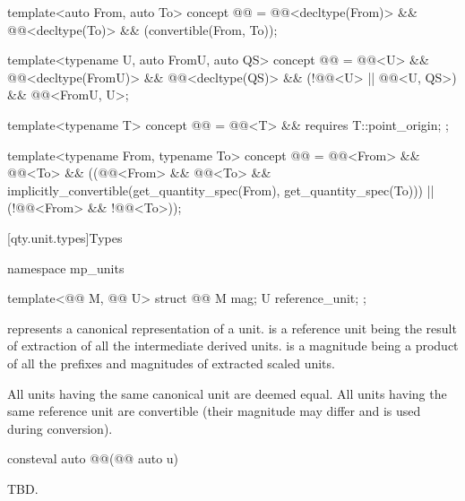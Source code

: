 \begin{itemdecl}
template<auto From, auto To>
concept @@ =
  @@<decltype(From)> && @@<decltype(To)> && (convertible(From, To));

template<typename U, auto FromU, auto QS>
concept @@ =
  @@<U> && @@<decltype(FromU)> && @@<decltype(QS)> &&
  (!@@<U> || @@<U, QS>) && @@<FromU, U{}>;

template<typename T>
concept @@ = @@<T> && requires { T::point_origin; };

template<typename From, typename To>
concept @@ =
  @@<From> && @@<To> &&
  ((@@<From> && @@<To> &&
    implicitly_convertible(get_quantity_spec(From{}), get_quantity_spec(To{}))) ||
   (!@@<From> && !@@<To>));
\end{itemdecl}

[qty.unit.types]{Types}

\begin{codeblock}
namespace mp_units {

template<@@ M, @@ U>
struct @@ {
  M mag;
  U reference_unit;
};

}
\end{codeblock}

\pnum
{} represents a canonical representation of a unit.
 is a reference unit being the result of extraction of all the intermediate derived units.
 is a magnitude being a product of all the prefixes and magnitudes of extracted scaled units.

\pnum
All units having the same canonical unit are deemed equal.
All units having the same reference unit are convertible
(their magnitude may differ and is used during conversion).

\begin{itemdecl}
consteval auto @@(@@ auto u)
\end{itemdecl}

\begin{itemdescr}
\pnum
\returns
TBD.
\end{itemdescr}

